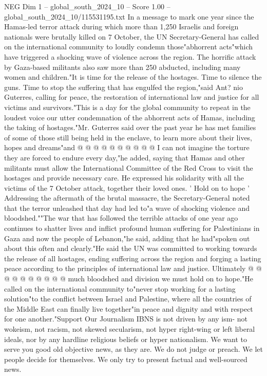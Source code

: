 \begin{textsample}{NEG Dim 1 – global\_south\_2024\_10 – Score 1.00 – global\_south\_2024\_10/115531195.txt}  \label{ex:f1_neg_432}
In a message to mark one year since the Hamas-led terror attack during which more than 1,250 Israelis and foreign nationals were brutally killed on 7 October, the UN Secretary-General has called on the international community to loudly condemn those"abhorrent acts"which have triggered a shocking wave of violence across the region.
The horrific attack by Gaza-based militants also saw more than 250 abducted, including many women and children."It is time for the release of the hostages.
Time to silence the guns.
Time to stop the suffering that has engulfed the region,"said Ant? nio Guterres, calling for peace, the restoration of international law and justice for all victims and survivors."This is a day for the global community to repeat in the loudest voice our utter condemnation of the abhorrent acts of Hamas, including the taking of hostages."Mr.
Guterres said over the past year he has met families of some of those still being held in the enclave, to learn more about their lives, hopes and dreams"and @ @ @ @ @ @ @ @ @ @ I can not imagine the torture they are forced to endure every day,"he added, saying that Hamas and other militants must allow the International Committee of the Red Cross to visit the hostages and provide necessary care.
He expressed his solidarity with all the victims of the 7 October attack, together their loved ones. ' Hold on to hope ' Addressing the aftermath of the brutal massacre, the Secretary-General noted that the terror unleashed that day had led to"a wave of shocking violence and bloodshed.""The war that has followed the terrible attacks of one year ago continues to shatter lives and inflict profound human suffering for Palestinians in Gaza and now the people of Lebanon,"he said, adding that he had"spoken out about this often and clearly."He said the UN was committed to working towards the release of all hostages, ending suffering across the region and forging a lasting peace according to the principles of international law and justice.
Ultimately @ @ @ @ @ @ @ @ @ @ much bloodshed and division we must hold on to hope."He called on the international community to"never stop working for a lasting solution"to the conflict between Israel and Palestine, where all the countries of the Middle East can finally live together"in peace and dignity and with respect for one another."Support Our Journalism IBNS is not driven by any ism- not wokeism, not racism, not skewed secularism, not hyper right-wing or left liberal ideals, nor by any hardline religious beliefs or hyper nationalism.
We want to serve you good old objective news, as they are.
We do not judge or preach.
We let people decide for themselves.
We only try to present factual and well-sourced news.

\end{textsample}
